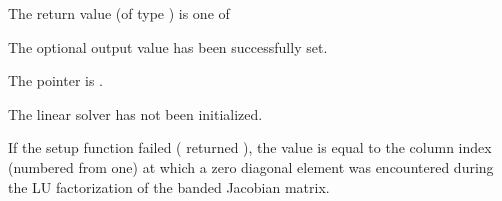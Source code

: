 {{\begin{args}
  \end{args}
}
{
  The return value  (of type ) is one of
  \begin{args}
  \item[\Id{IDABAND\_SUCCESS}] 
    The optional output value has been successfully set.
  \item[\Id{IDABAND\_MEM\_NULL}]
    The  pointer is .
  \item[\Id{IDABAND\_LMEM\_NULL}]
    The {\idaband} linear solver has not been initialized.
  \end{args}
}
{
  If the {\idaband} setup function failed ( returned
  ), the value  is equal to the column index
  (numbered from one) at which a zero diagonal element was encountered during
  the LU factorization of the banded Jacobian matrix.
}
%
%
}
